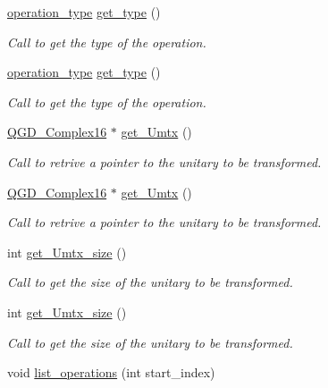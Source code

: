 \begin{DoxyCompactItemize}
\hyperlink{operations_2include_2_operation_8h_ad99e62941c8e4b13e5fc45ecaaf65eff}{operation\+\_\+type} \hyperlink{class_operation_acc601a7a00616fd6e2a61f61e084afac}{get\+\_\+type} ()
\begin{DoxyCompactList}\small\item\em Call to get the type of the operation. \end{DoxyCompactList}\item 
\hyperlink{operations_2include_2_operation_8h_ad99e62941c8e4b13e5fc45ecaaf65eff}{operation\+\_\+type} \hyperlink{class_operation_acc601a7a00616fd6e2a61f61e084afac}{get\+\_\+type} ()
\begin{DoxyCompactList}\small\item\em Call to get the type of the operation. \end{DoxyCompactList}\item 
\hyperlink{struct_q_g_d___complex16}{Q\+G\+D\+\_\+\+Complex16} $\ast$ \hyperlink{class_decomposition___base_a8375551739dde405c4e121ae0bbb09bf}{get\+\_\+\+Umtx} ()
\begin{DoxyCompactList}\small\item\em Call to retrive a pointer to the unitary to be transformed. \end{DoxyCompactList}\item 
\hyperlink{struct_q_g_d___complex16}{Q\+G\+D\+\_\+\+Complex16} $\ast$ \hyperlink{class_decomposition___base_ad1e8fca5e5710d3a59f10ed6c523a502}{get\+\_\+\+Umtx} ()
\begin{DoxyCompactList}\small\item\em Call to retrive a pointer to the unitary to be transformed. \end{DoxyCompactList}\item 
int \hyperlink{class_decomposition___base_a3a1f83b85fd9e7e67a89a79b8cdc1e4a}{get\+\_\+\+Umtx\+\_\+size} ()
\begin{DoxyCompactList}\small\item\em Call to get the size of the unitary to be transformed. \end{DoxyCompactList}\item 
int \hyperlink{class_decomposition___base_a3a1f83b85fd9e7e67a89a79b8cdc1e4a}{get\+\_\+\+Umtx\+\_\+size} ()
\begin{DoxyCompactList}\small\item\em Call to get the size of the unitary to be transformed. \end{DoxyCompactList}\item 
void \hyperlink{class_decomposition___base_a4c6c81d70f49ee249aa455a4f2718ee2}{list\+\_\+operations} (int start\+\_\+index)

\end{DoxyCompactItemize}
